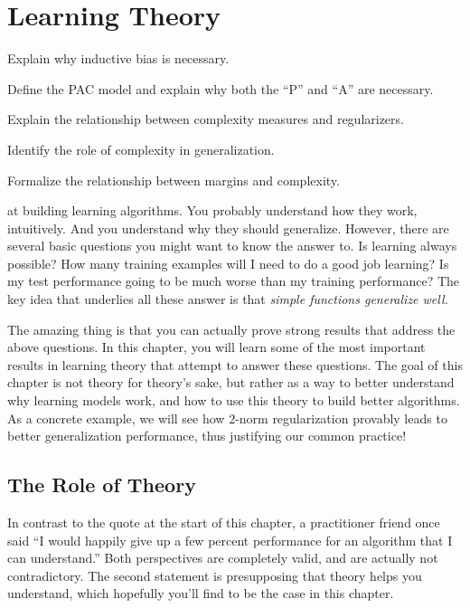 \chapter{Learning Theory} \label{sec:thy}


\begin{learningobjectives}
\item Explain why inductive bias is necessary.
\item Define the PAC model and explain why both the ``P'' and ``A''
  are necessary.
\item Explain the relationship between complexity measures and
  regularizers.
\item Identify the role of complexity in generalization.
\item Formalize the relationship between margins and complexity.
\end{learningobjectives}

\dependencies{}

 at building learning
algorithms.  You probably understand how they work, intuitively.  And
you understand why they should generalize.  However, there are several
basic questions you might want to know the answer to.  Is learning
always possible?  How many training examples will I need to do a good
job learning?  Is my test performance going to be much worse than my
training performance?  The key idea that underlies all these answer is
that \emph{simple functions generalize well.}

The amazing thing is that you can actually prove strong results that
address the above questions.  In this chapter, you will learn some of
the most important results in learning theory that attempt to answer
these questions.  The goal of this chapter is not theory for theory's
sake, but rather as a way to better understand why learning models
work, and how to use this theory to build better algorithms.  As a
concrete example, we will see how $2$-norm regularization provably
leads to better generalization performance, thus justifying our common
practice!

\section{The Role of Theory}

In contrast to the quote at the start of this chapter, a practitioner
friend once said ``I would happily give up a few percent performance
for an algorithm that I can understand.''  Both perspectives are
completely valid, and are actually not contradictory.  The second
statement is presupposing that theory helps you understand, which
hopefully you'll find to be the case in this chapter.

